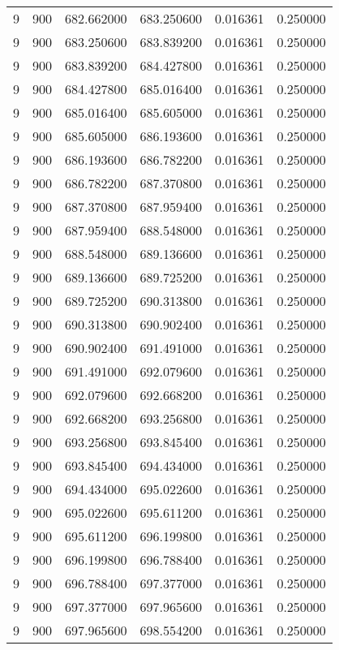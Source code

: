 \begin{longtable}{rrrrrr}
9 & 900 & 682.662000 & 683.250600 & 0.016361 & 0.250000 \\
9 & 900 & 683.250600 & 683.839200 & 0.016361 & 0.250000 \\
9 & 900 & 683.839200 & 684.427800 & 0.016361 & 0.250000 \\
9 & 900 & 684.427800 & 685.016400 & 0.016361 & 0.250000 \\
9 & 900 & 685.016400 & 685.605000 & 0.016361 & 0.250000 \\
9 & 900 & 685.605000 & 686.193600 & 0.016361 & 0.250000 \\
9 & 900 & 686.193600 & 686.782200 & 0.016361 & 0.250000 \\
9 & 900 & 686.782200 & 687.370800 & 0.016361 & 0.250000 \\
9 & 900 & 687.370800 & 687.959400 & 0.016361 & 0.250000 \\
9 & 900 & 687.959400 & 688.548000 & 0.016361 & 0.250000 \\
9 & 900 & 688.548000 & 689.136600 & 0.016361 & 0.250000 \\
9 & 900 & 689.136600 & 689.725200 & 0.016361 & 0.250000 \\
9 & 900 & 689.725200 & 690.313800 & 0.016361 & 0.250000 \\
9 & 900 & 690.313800 & 690.902400 & 0.016361 & 0.250000 \\
9 & 900 & 690.902400 & 691.491000 & 0.016361 & 0.250000 \\
9 & 900 & 691.491000 & 692.079600 & 0.016361 & 0.250000 \\
9 & 900 & 692.079600 & 692.668200 & 0.016361 & 0.250000 \\
9 & 900 & 692.668200 & 693.256800 & 0.016361 & 0.250000 \\
9 & 900 & 693.256800 & 693.845400 & 0.016361 & 0.250000 \\
9 & 900 & 693.845400 & 694.434000 & 0.016361 & 0.250000 \\
9 & 900 & 694.434000 & 695.022600 & 0.016361 & 0.250000 \\
9 & 900 & 695.022600 & 695.611200 & 0.016361 & 0.250000 \\
9 & 900 & 695.611200 & 696.199800 & 0.016361 & 0.250000 \\
9 & 900 & 696.199800 & 696.788400 & 0.016361 & 0.250000 \\
9 & 900 & 696.788400 & 697.377000 & 0.016361 & 0.250000 \\
9 & 900 & 697.377000 & 697.965600 & 0.016361 & 0.250000 \\
9 & 900 & 697.965600 & 698.554200 & 0.016361 & 0.250000 \\

\end{longtable}
